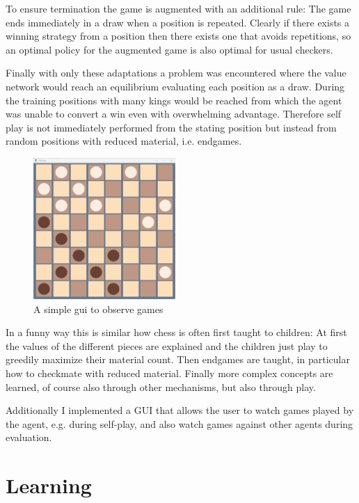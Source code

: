 \documentclass[a4paper,12pt]{article}
\theoremstyle{definition}
\theoremstyle{definition}
\theoremstyle{definition}
\theoremstyle{definition}
\theoremstyle{definition}
\theoremstyle{definition}
\begin{document}
	To ensure termination the game is augmented with an additional rule: The game ends immediately in a draw when a position is repeated. Clearly if there exists a winning strategy from a position then there exists one that avoids repetitions, so an optimal policy for the augmented game is also optimal for usual checkers.
	
	Finally with only these adaptations a problem was encountered where the value network would reach an equilibrium evaluating each position as a draw. During the training positions with many kings would be reached from which the agent was unable to convert a win even with overwhelming advantage. Therefore self play is not immediately performed from the stating position but instead from random positions with reduced material, i.e. endgames.
	
		
	\begin{figure}
		\begin{center}
			\includegraphics[width=0.48\textwidth]{gui.png}
		\end{center}
		\caption{A simple gui to observe games}
	\end{figure}

	In a funny way this is similar how chess is often first taught to children: At first the values of the different pieces are explained and the children just play to greedily maximize their material count. Then endgames are taught, in particular how to checkmate with reduced material. Finally more complex concepts are learned, of course also through other mechanisms, but also through play.

	
	Additionally I implemented a GUI that allows the user to watch games played by the agent, e.g. during self-play, and also watch games against other agents during evaluation.
	

	\section{Learning}
	
\end{document}
